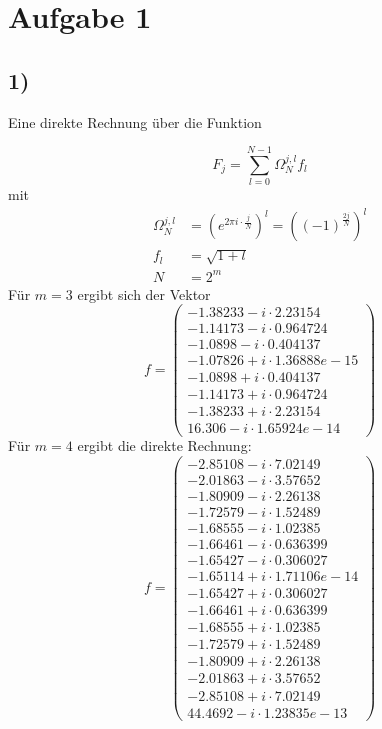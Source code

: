 \section*{Aufgabe 1}
\subsection*{1)} 
Eine direkte Rechnung über die Funktion 

\begin{equation}
    F_j = \sum_{l=0}^{N-1}\Omega_N^{j, l} f_l
\end{equation}
mit 
\begin{align}
    \Omega_N^{j, l} &= (e^{2 \pi i \cdot \frac{j}{N}})^{l} = \left((-1)^{\frac{2j}{N}}\right)^{l} \\
    f_l &= \sqrt{1+l} \\
    N &= 2^m
\end{align}
Für $m = 3$ ergibt sich der Vektor
\begin{equation}
    f = 
    \begin{pmatrix} 
        -1.38233 - i \cdot 2.23154 \\
        -1.14173 - i \cdot 0.964724 \\
        -1.0898  - i \cdot 0.404137 \\
        -1.07826 + i \cdot 1.36888e-15 \\
        -1.0898  + i \cdot 0.404137 \\
        -1.14173 + i \cdot 0.964724 \\
        -1.38233 + i \cdot 2.23154 \\
        16.306   - i \cdot 1.65924e-14
    \end{pmatrix}
\end{equation}
Für $m = 4$ ergibt die direkte Rechnung:
\begin{equation}
    f =
    \begin{pmatrix}
        -2.85108 - i \cdot 7.02149  \\
        -2.01863 - i \cdot 3.57652 \\
        -1.80909 - i \cdot 2.26138 \\
        -1.72579 - i \cdot 1.52489 \\
        -1.68555 - i \cdot 1.02385 \\
        -1.66461 - i \cdot 0.636399 \\
        -1.65427 - i \cdot 0.306027 \\
        -1.65114 + i \cdot 1.71106e-14 \\
        -1.65427 + i \cdot 0.306027 \\
        -1.66461 + i \cdot 0.636399 \\
        -1.68555 + i \cdot 1.02385 \\
        -1.72579 + i \cdot 1.52489 \\
        -1.80909 + i \cdot 2.26138 \\
        -2.01863 + i \cdot 3.57652 \\
        -2.85108 + i \cdot 7.02149 \\
         44.4692 - i \cdot 1.23835e-13
    \end{pmatrix}
\end{equation}
